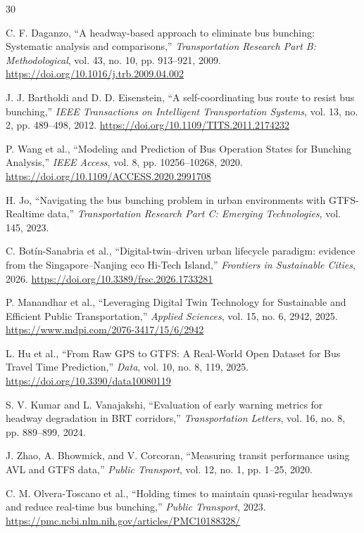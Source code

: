 \documentclass[journal,twocolumn]{IEEEtran}
\begin{document}
\begin{thebibliography}{30}

	 C. F. Daganzo, ``A headway-based approach to eliminate bus bunching: Systematic analysis and comparisons,'' \textit{Transportation Research Part B: Methodological}, vol. 43, no. 10, pp. 913--921, 2009. \url{https://doi.org/10.1016/j.trb.2009.04.002}

	 J. J. Bartholdi and D. D. Eisenstein, ``A self-coordinating bus route to resist bus bunching,'' \textit{IEEE Transactions on Intelligent Transportation Systems}, vol. 13, no. 2, pp. 489--498, 2012. \url{https://doi.org/10.1109/TITS.2011.2174232}

	 P. Wang et al., ``Modeling and Prediction of Bus Operation States for Bunching Analysis,'' \textit{IEEE Access}, vol. 8, pp. 10256--10268, 2020. \url{https://doi.org/10.1109/ACCESS.2020.2991708}

	 H. Jo, ``Navigating the bus bunching problem in urban environments with GTFS-Realtime data,'' \textit{Transportation Research Part C: Emerging Technologies}, vol. 145, 2023.

	 C. Botín-Sanabria et al., ``Digital-twin–driven urban lifecycle paradigm: evidence from the Singapore–Nanjing eco Hi-Tech Island,'' \textit{Frontiers in Sustainable Cities}, 2026. \url{https://doi.org/10.3389/frsc.2026.1733281}

	 P. Manandhar et al., ``Leveraging Digital Twin Technology for Sustainable and Efficient Public Transportation,'' \textit{Applied Sciences}, vol. 15, no. 6, 2942, 2025. \url{https://www.mdpi.com/2076-3417/15/6/2942}

	 L. Hu et al., ``From Raw GPS to GTFS: A Real-World Open Dataset for Bus Travel Time Prediction,'' \textit{Data}, vol. 10, no. 8, 119, 2025. \url{https://doi.org/10.3390/data10080119}

	 S. V. Kumar and L. Vanajakshi, ``Evaluation of early warning metrics for headway degradation in BRT corridors,'' \textit{Transportation Letters}, vol. 16, no. 8, pp. 889--899, 2024.

	 J. Zhao, A. Bhowmick, and V. Corcoran, ``Measuring transit performance using AVL and GTFS data,'' \textit{Public Transport}, vol. 12, no. 1, pp. 1--25, 2020.

	 C. M. Olvera-Toscano et al., ``Holding times to maintain quasi-regular headways and reduce real-time bus bunching,'' \textit{Public Transport}, 2023. \url{https://pmc.ncbi.nlm.nih.gov/articles/PMC10188328/}


\end{thebibliography}
\end{document}
